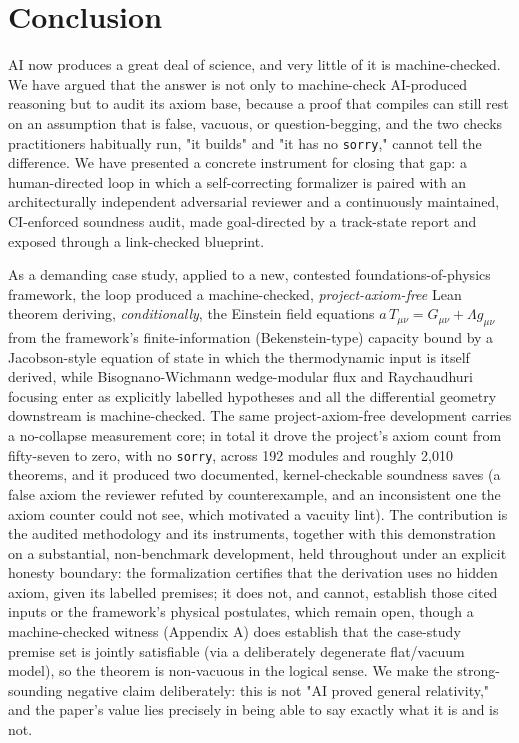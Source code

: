 \documentclass[11pt]{article}
\begin{document}
\section{Conclusion}

AI now produces a great deal of science, and very little of it is machine-checked. We have argued
that the answer is not only to machine-check AI-produced reasoning but to audit its axiom base,
because a proof that compiles can still rest on an assumption that is false, vacuous, or
question-begging, and the two checks practitioners habitually run, "it builds" and "it has no
\texttt{sorry}," cannot tell the difference. We have presented a concrete instrument for closing that gap: a
human-directed loop in which a self-correcting formalizer is paired with an architecturally
independent adversarial reviewer and a continuously maintained, CI-enforced soundness audit, made
goal-directed by a track-state report and exposed through a link-checked blueprint.

As a demanding case study, applied to a new, contested foundations-of-physics framework, the loop
produced a machine-checked,
\emph{project-axiom-free} Lean theorem deriving, \emph{conditionally}, the Einstein field equations
$a\,T_{\mu\nu}=G_{\mu\nu}+\Lambda g_{\mu\nu}$ from the framework's finite-information
(Bekenstein-type) capacity bound by a Jacobson-style equation of state in which the thermodynamic
input is itself derived, while Bisognano-Wichmann wedge-modular flux and Raychaudhuri focusing enter
as explicitly labelled hypotheses and all the differential geometry downstream is machine-checked.
The same project-axiom-free development carries a no-collapse measurement core; in total it
drove the project's axiom count from fifty-seven to zero, with no \texttt{sorry}, across 192 modules
and roughly 2,010 theorems, and it produced two documented, kernel-checkable soundness saves (a false
axiom the reviewer refuted by counterexample, and an inconsistent one the axiom counter could not see,
which motivated a vacuity lint). The contribution is the audited methodology and its instruments, together with this
demonstration on a substantial, non-benchmark development, held throughout under an explicit honesty
boundary: the
formalization certifies that the derivation uses no hidden axiom, given its labelled premises; it
does not, and cannot, establish those cited inputs or the framework's physical postulates, which
remain open, though a machine-checked witness (Appendix A) does establish that the case-study premise
set is jointly satisfiable (via a deliberately degenerate flat/vacuum model), so the theorem is
non-vacuous in the logical sense. We make the strong-sounding negative claim deliberately: this is
not "AI proved general relativity," and the paper's value lies precisely in being able to say exactly
what it is and is not.
\end{document}

